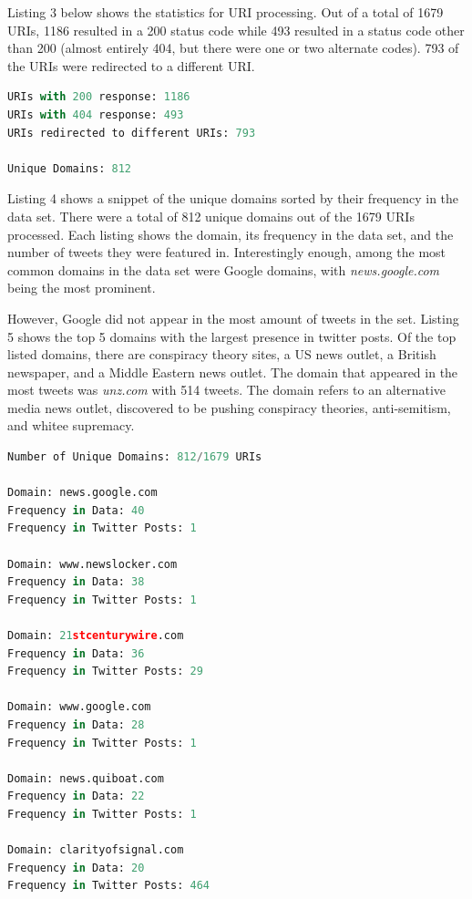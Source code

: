 \documentclass[12pt]{article}
\begin{document}
\par Listing 3 below shows the statistics for URI processing. Out of a total of 1679 URIs, 1186 resulted in a 200 status code while 493 resulted in a status code other than 200 (almost entirely 404, but there were one or two alternate codes). 793 of the URIs were redirected to a different URI.

\begin{lstlisting}[language=Python, caption={Stats from URI processing}, label=lst:copy]
URIs with 200 response: 1186
URIs with 404 response: 493
URIs redirected to different URIs: 793

Unique Domains: 812
\end{lstlisting}

Listing 4 shows a snippet of the unique domains sorted by their frequency in the data set. There were a total of 812 unique domains out of the 1679 URIs processed. Each listing shows the domain, its frequency in the data set, and the number of tweets they were featured in. Interestingly enough, among the most common domains in the data set were Google domains, with \emph{news.google.com} being the most prominent.

\par However, Google did not appear in the most amount of tweets in the set. Listing 5 shows the top 5 domains with the largest presence in twitter posts. Of the top listed domains, there are conspiracy theory sites, a US news outlet, a British newspaper, and a Middle Eastern news outlet. The domain that appeared in the most tweets was \emph{unz.com} with 514 tweets. The domain refers to an alternative media news outlet, discovered to be pushing conspiracy theories, anti-semitism, and whitee supremacy.

\begin{lstlisting}[language=Python, caption={Segment of unique domains sorted by frequency in data set}, label=lst:copy]
Number of Unique Domains: 812/1679 URIs

Domain: news.google.com
Frequency in Data: 40
Frequency in Twitter Posts: 1

Domain: www.newslocker.com
Frequency in Data: 38
Frequency in Twitter Posts: 1

Domain: 21stcenturywire.com
Frequency in Data: 36
Frequency in Twitter Posts: 29

Domain: www.google.com
Frequency in Data: 28
Frequency in Twitter Posts: 1

Domain: news.quiboat.com
Frequency in Data: 22
Frequency in Twitter Posts: 1

Domain: clarityofsignal.com
Frequency in Data: 20
Frequency in Twitter Posts: 464
\end{lstlisting}
\end{document}
